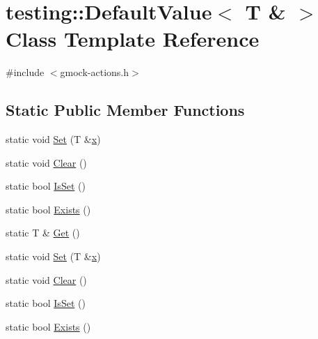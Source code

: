 \hypertarget{classtesting_1_1_default_value_3_01_t_01_6_01_4}{}\section{testing\+::Default\+Value$<$ T \& $>$ Class Template Reference}
\label{classtesting_1_1_default_value_3_01_t_01_6_01_4}


{\ttfamily \#include $<$gmock-\/actions.\+h$>$}

\subsection*{Static Public Member Functions}
\begin{DoxyCompactItemize}
\item 
static void \mbox{\hyperlink{classtesting_1_1_default_value_3_01_t_01_6_01_4_a9863abf3d311ce5007d7e57dfce2f252}{Set}} (T \&\mbox{\hyperlink{_obj__test_2lib_2googletest-master_2googlemock_2test_2gmock-matchers__test_8cc_a6150e0515f7202e2fb518f7206ed97dc}{x}})
\item 
static void \mbox{\hyperlink{classtesting_1_1_default_value_3_01_t_01_6_01_4_a3c8f9f81e591370f9b33798f58ca1a10}{Clear}} ()
\item 
static bool \mbox{\hyperlink{classtesting_1_1_default_value_3_01_t_01_6_01_4_a3e61547c2f0141cc8004385f3a9c817d}{Is\+Set}} ()
\item 
static bool \mbox{\hyperlink{classtesting_1_1_default_value_3_01_t_01_6_01_4_a38420499e17d2fb4146ae6c4265f0d55}{Exists}} ()
\item 
static T \& \mbox{\hyperlink{classtesting_1_1_default_value_3_01_t_01_6_01_4_a1310448dd8c171aecfcbf7c8df5de7bd}{Get}} ()
\item 
static void \mbox{\hyperlink{classtesting_1_1_default_value_3_01_t_01_6_01_4_a9863abf3d311ce5007d7e57dfce2f252}{Set}} (T \&\mbox{\hyperlink{_obj__test_2lib_2googletest-master_2googlemock_2test_2gmock-matchers__test_8cc_a6150e0515f7202e2fb518f7206ed97dc}{x}})
\item 
static void \mbox{\hyperlink{classtesting_1_1_default_value_3_01_t_01_6_01_4_a3c8f9f81e591370f9b33798f58ca1a10}{Clear}} ()
\item 
static bool \mbox{\hyperlink{classtesting_1_1_default_value_3_01_t_01_6_01_4_a3e61547c2f0141cc8004385f3a9c817d}{Is\+Set}} ()
\item 
static bool \mbox{\hyperlink{classtesting_1_1_default_value_3_01_t_01_6_01_4_a38420499e17d2fb4146ae6c4265f0d55}{Exists}} ()

\end{DoxyCompactItemize}
